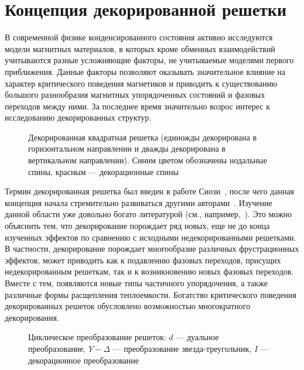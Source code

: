 \section{Концепция декорированной решетки} 

В современной физике конденсированного состояния активно исследуются модели магнитных материалов, в которых кроме обменных взаимодействий учитываются разные усложняющие факторы, не учитываемые моделями первого приближения. Данные факторы позволяют оказывать значительное влияние на характер критического поведения магнетиков и приводить к существованию большого разнообразия магнитных упорядоченных состояний и фазовых переходов между ними. За последнее время значительно возрос интерес к исследованию декорированных структур.

\begin{figure}[h]
	\caption{Декорированная квадратная решетка (единожды декорирована в горизонтальном направлении и дважды декорирована в вертикальном направлении). Синим цветом обозначены нодальные спины, красным --- декорационные спины}
	\label{decorSquare}
\end{figure}

Термин \guillemotleft декорированная решетка\guillemotright \hspace{1pt} был введен в работе Сиози~\cite{siozi1951}, после чего данная концепция начала стремительно развиваться другими авторами~\cite{siozi_domb1972, fisher1958}. Изучение данной области уже довольно богато литературой (см., например,~\cite{jaščur2016, strečka2019_1, strečka2019_2, gálisová2018, cenčariková2016, stubňa2017, mutalamov2020}). Это можно объяснить тем, что декорирование порождает ряд новых, еще не до конца изученных эффектов по сравнению с исходными недекорированными решетками. В частности, декорирование порождает многообразие различных фрустрационных эффектов, может приводить как к подавлению фазовых переходов, присущих недекорированным решеткам, так и к возникновению новых фазовых переходов. Вместе с тем, появляются новые типы частичного упорядочения, а также различные формы расщепления теплоемкости. Богатство критического поведения декорированных решеток обусловлено возможностью многократного декорирования.

\begin{figure}[h]
	\caption{Циклическое преобразование решеток: $d$ --- дуальное преобразование, $Y - \Delta$ --- преобразование \guillemotleft звезда-треугольник\guillemotright \hspace{1pt}, $I$ --- декорационное преобразование~\cite{siozi_domb1972}}
	\label{transformCycle}
\end{figure}

